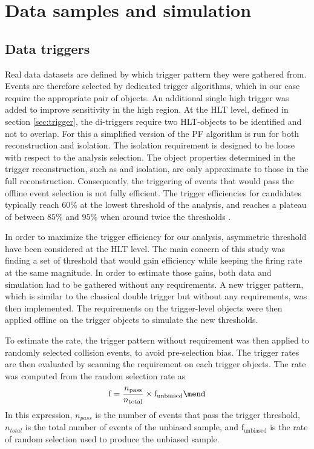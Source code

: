 \section{Data samples and simulation}
\label{sec:analysis_samples}

\subsection{Data triggers}
Real data datasets are defined by which trigger pattern they were gathered from. Events are therefore selected by dedicated trigger algorithms, which in our case require the appropriate pair of \tauh objects. An additional single high \pt \tauh trigger was added to improve sensitivity in the high \pt region. At the HLT level, defined in section \ref{sec:trigger}, the di-\tauh triggers require two HLT-\tauh objects to be identified and not to overlap. For this a simplified version of the PF algorithm is run for both \tauh reconstruction and isolation. The isolation requirement is designed to be loose with respect to the analysis selection. The object properties determined in the trigger reconstruction, such as \pt and isolation, are only approximate to those in the full reconstruction. Consequently, the triggering of events that would pass the offline event selection is not fully efficient. The trigger efficiencies for \tauh candidates typically reach $60\%$ at the lowest \pt threshold of the analysis, and reaches a plateau of between $85\%$ and $95\%$ when around twice the \pt thresholds \cite{Sirunyan_2018}. 

In order to maximize the trigger efficiency for our analysis, asymmetric \pt threshold have been considered at the HLT level. The main concern of this study was finding a set of \pt threshold that would gain efficiency while keeping the firing rate at the same magnitude. 
In order to estimate those gains, both data and simulation had to be gathered without any \pt requirements. A new trigger pattern, which is similar to the classical double \tauh trigger but without any \pt requirements, was then implemented. The \pt requirements on the trigger-level objects were then applied offline on the \tauh trigger objects to simulate the new \pt thresholds.

To estimate the rate, the trigger pattern without \pt requirement was then applied to randomly selected collision events, to avoid pre-selection bias. The trigger rates are then evaluated by scanning the \pt requirement on each \tauh trigger objects. The rate was computed from the random selection rate as
\begin{equation}
    \mathrm{f} = \frac{n_{\mathrm{pass}}}{n_{\mathrm{total}}} \times \mathrm{f}_{\mathrm{unbiased}} \mend
\end{equation}
In this expression, $n_{pass}$ is the number of events that pass the trigger threshold, $n_{total}$ is the total number of events of the unbiased sample, and $\mathrm{f}_{\mathrm{unbiased}}$ is the rate of random selection used to produce the unbiased sample. 

